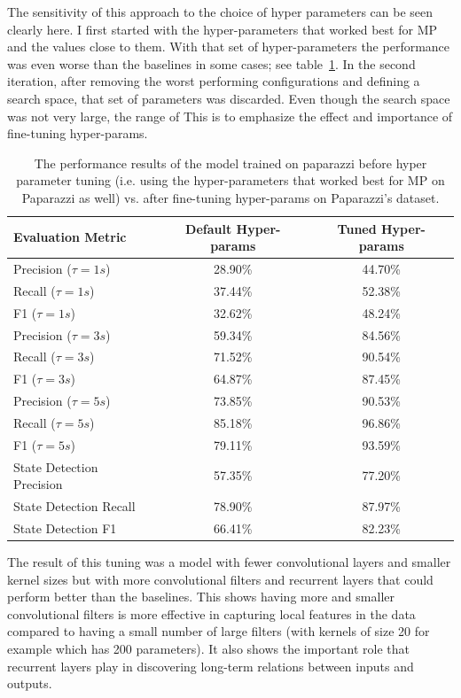The sensitivity of this approach to the choice of hyper parameters can be seen clearly here. I first started with the hyper-parameters that worked best for MP and the values close to them. With that set of hyper-parameters the performance was even worse than the baselines in some cases; see table~\ref{tab:results_no_tuning}.
In the second iteration, after removing the worst performing configurations and defining a search space, that set of parameters was discarded. 
Even though the search space was not very large, the range of 
This is to emphasize the effect and importance of fine-tuning hyper-params.

\begin{table}[]
    \centering
    \begin{tabular}{lcc}
    \toprule
\textbf{Evaluation Metric} & \textbf{Default Hyper-params} & \textbf{Tuned Hyper-params} \\\midrule
Precision ($\tau=1s$)      &  28.90\%  &  44.70\% \\
Recall ($\tau=1s$)         &  37.44\%  &  52.38\% \\
F1 ($\tau=1s$)             &  32.62\%  &  48.24\% \\ \midrule
Precision ($\tau=3s$)      &  59.34\%  &  84.56\% \\
Recall ($\tau=3s$)         &  71.52\%  &  90.54\% \\
F1 ($\tau=3s$)             &  64.87\%  &  87.45\% \\ \midrule
Precision ($\tau=5s$)      &  73.85\%  &  90.53\% \\
Recall ($\tau=5s$)         &  85.18\%  &  96.86\% \\
F1 ($\tau=5s$)             &  79.11\%  &  93.59\% \\ \midrule
State Detection Precision  &  57.35\%  &  77.20\% \\
State Detection Recall     &  78.90\%  &  87.97\% \\
State Detection F1         &  66.41\%  &  82.23\% \\
\bottomrule
    \end{tabular}
    \caption{The performance results of the model trained on paparazzi before hyper parameter tuning (i.e. using the hyper-parameters that worked best for MP on Paparazzi as well) vs. after fine-tuning hyper-params on Paparazzi's dataset.}
    \label{tab:results_no_tuning}
\end{table}

\begin{rqanswer}
The result of this tuning was a model with fewer convolutional layers and smaller kernel sizes but with more convolutional filters and recurrent layers that could perform better than the baselines. This shows having more and smaller convolutional filters is more effective in capturing local features in the data compared to having a small number of large filters (with kernels of size 20 for example which has 200 parameters). It also shows the important role that recurrent layers play in discovering long-term relations between inputs and outputs. 
\end{rqanswer}


